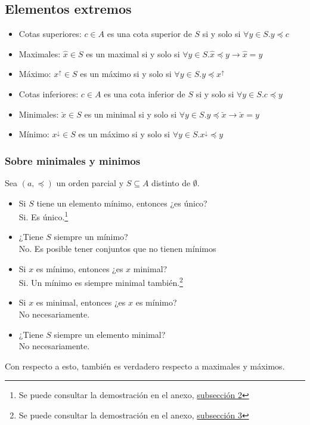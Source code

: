 \documentclass[../main.tex]{subfiles}
\begin{document}
\subsection{Elementos extremos}
\begin{itemize}
    \item Cotas superiores: $c \in A$ es una cota superior de $S$ si y solo si $\forall y \in S . y \preceq c$
    \item Maximales: $\hat{x} \in S$ es un maximal si y solo si $\forall y \in S . \hat{x} \preceq y \rightarrow \hat{x} = y$
    \item Máximo: $x^{\uparrow} \in S$ es un máximo si y solo si $\forall y \in S . y \preceq x^{\uparrow}$
    \item Cotas inferiores: $c \in A$ es una cota inferior de $S$ si y solo si $\forall y \in S . c \preceq y$
    \item Minimales: $\breve{x} \in S$ es un minimal si y solo si $\forall y \in S . y \preceq \breve{x} \rightarrow \breve{x} = y$
    \item Mínimo: $x^{\downarrow} \in S$ es un máximo si y solo si $\forall y \in S . x^{\downarrow} \preceq y$
\end{itemize}
\subsubsection{Sobre minimales y minimos}
Sea $(a,\preceq)$ un orden parcial y $S \subseteq A$ distinto de $\emptyset$.
\begin{itemize}
    \item Si $S$ tiene un elemento mínimo, entonces ¿es único?\\
    Si. Es único.\footnote{Se puede consultar la demostración en el anexo, \hyperref[sec:dem_min_unico]{subsección 2}}
    \item ¿Tiene $S$ siempre un mínimo?\\
    No. Es posible tener conjuntos que no tienen mínimos
    \item Si $x$ es mínimo, entonces ¿es $x$ minimal?\\
    Si. Un mínimo es siempre minimal también.\footnote{Se puede consultar la demostración en el anexo, \hyperref[sec:dem_min_minimal]{subsección 3}}
    \item Si $x$ es minimal, entonces ¿es $x$ es mínimo?\\
    No necesariamente.
    \item ¿Tiene $S$ siempre un elemento minimal?\\
    No necesariamente.
\end{itemize}
Con respecto a esto, también es verdadero respecto a maximales y máximos.
\end{document}
